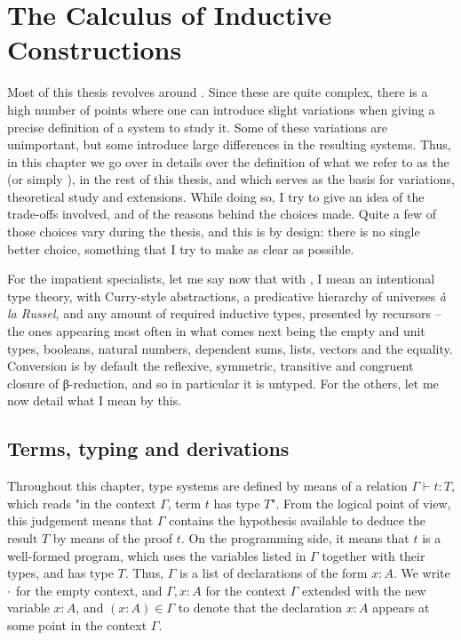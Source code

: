 \chapter{The Calculus of Inductive Constructions}
\label{chap:tech-intro}

Most of this thesis revolves around .
Since these are
quite complex, there is a high number of points where one can introduce slight variations
when giving a precise definition of a system to study it.
Some of these variations are unimportant, but some introduce large differences in the
resulting systems. Thus, in this chapter we go over in details over
the definition of what we refer to as the
 (or simply ), in the rest of this
thesis, and which serves as the basis for variations, theoretical study and extensions.
While doing so, I try to give an idea of the trade-offs involved, and of the reasons
behind the choices made. Quite a few of those choices vary during the thesis,
and this is by design: there is no single better choice, 
something that I try to make as clear as possible.

For the impatient specialists, let me say now that with , I
mean an intentional type theory, with Curry-style abstractions,
a predicative hierarchy of universes \textit{à la Russel},
and any amount of required inductive types, presented by recursors – 
the ones appearing most often in what comes next being the empty and
unit types, booleans, natural numbers, dependent sums, lists, vectors and the equality.
Conversion is by default the reflexive, symmetric, transitive and congruent
closure of β-reduction, and
so in particular it is untyped. For the others, let me now detail what I mean by this.

\section{Terms, typing and derivations}

Throughout this chapter, type systems are defined by means of a relation
$\Gamma \vdash t : T$, which reads "in the context $\Gamma$, term $t$ has type $T$".
From the logical point of view, this judgement means that $\Gamma$
contains the hypothesis available to deduce the
result $T$ by means of the proof $t$. On the programming side, it means that
$t$ is a well-formed program,
which uses the variables listed in $\Gamma$ together with their types,
and has type $T$.
Thus, $\Gamma$ is a list of declarations of the form $x : A$. We write $\cdot$ for the
empty context, and $\Gamma, x : A$ for the context $\Gamma$ extended with the new variable $x : A$, and $(x : A) \in \Gamma$ to denote that the declaration $x : A$ appears at some
point in the context $\Gamma$.

